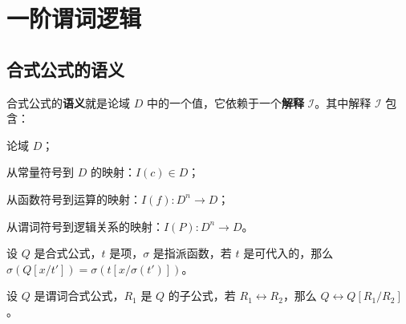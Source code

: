 \section{一阶谓词逻辑}

\subsection{合式公式的语义}

合式公式的\textbf{语义}就是论域 $D$ 中的一个值，它依赖于一个\textbf{解释} $\mathcal{I}$。其中解释 $\mathcal{I}$ 包含：
\begin{theorem}
    \item 论域 $D$；
    \item 从常量符号到 $D$ 的映射：$I(c) \in D$；
    \item 从函数符号到运算的映射：$I(f): D^n \rightarrow D$；
    \item 从谓词符号到逻辑关系的映射：$I(P): D^n \rightarrow D$。
\end{theorem}

\begin{theorem}
    设 $Q$ 是合式公式，$t$ 是项，$\sigma$ 是指派函数，若 $t$ 是可代入的，那么 $\sigma(Q[x / t']) = \sigma(t[x / \sigma(t')])$。
\end{theorem}

\begin{theorem}[替换定理]
    设 $Q$ 是谓词合式公式，$R_1$ 是 $Q$ 的子公式，若 $R_1 \leftrightarrow R_2$，那么 $Q \leftrightarrow Q[R_1 / R_2]$。
\end{theorem}
